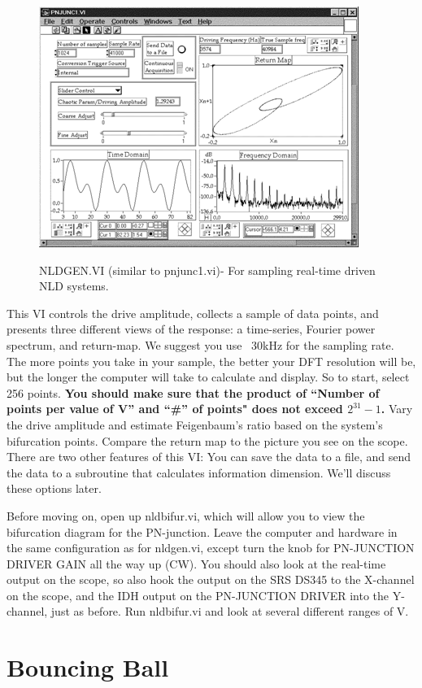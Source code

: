 \documentclass{../lab}
\begin{document}
\begin{figure}[h]
    \centering
    \href{http://experimentationlab.berkeley.edu/sites/default/files/images/Nldimage128.gif}{\includegraphics[width=0.5\linewidth]{images/Nldimage128.png}}
    \caption{NLDGEN.VI (similar to pnjunc1.vi)- For sampling real-time driven NLD systems.}
    \label{fig:NLDGENVI}
\end{figure}

This VI controls the drive amplitude, collects a sample of data points, and presents three different views of the response: a time-series, Fourier power spectrum, and return-map. We suggest you use ~30kHz for the sampling rate. The more points you take in your sample, the better your DFT resolution will be, but the longer the computer will take to calculate and display. So to start, select 256 points. \textbf{You should make sure that the product of ``Number of points per value of V'' and ``\#'' of points" does not exceed $2^{31} - 1$.}  Vary the drive amplitude and estimate Feigenbaum's ratio based on the system's bifurcation points. Compare the return map to the picture you see on the scope. There are two other features of this VI: You can save the data to a file, and send the data to a subroutine that calculates information dimension. We'll discuss these options later.

Before moving on, open up nldbifur.vi, which will allow you to view the bifurcation diagram for the PN-junction. Leave the computer and hardware in the same configuration as for nldgen.vi, except turn the knob for PN-JUNCTION DRIVER GAIN all the way up (CW). You should also look at the real-time output on the scope, so also hook the output on the SRS DS345 to the X-channel on the scope, and the IDH output on the PN-JUNCTION DRIVER into the Y-channel, just as before. Run nldbifur.vi and look at several different ranges of V.

\section{Bouncing Ball}
\end{document}
